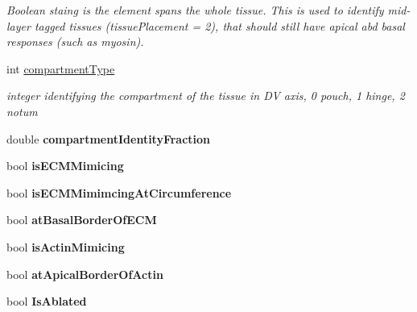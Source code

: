 \begin{DoxyCompactItemize}
\begin{DoxyCompactList}\small\item\em Boolean staing is the element spans the whole tissue. This is used to identify mid-\/layer tagged tissues (tissue\+Placement = 2), that should still have apical abd basal responses (such as myosin). \end{DoxyCompactList}\item 
\hypertarget{classShapeBase_a47bfa280bf33fc0557e8d804aab3936c}{}int \hyperlink{classShapeBase_a47bfa280bf33fc0557e8d804aab3936c}{compartment\+Type}\label{classShapeBase_a47bfa280bf33fc0557e8d804aab3936c}

\begin{DoxyCompactList}\small\item\em integer identifying the compartment of the tissue in D\+V axis, 0 pouch, 1 hinge, 2 notum \end{DoxyCompactList}\item 
\hypertarget{classShapeBase_aada8d021521dbe6815a887bc0cb28cc8}{}double {\bfseries compartment\+Identity\+Fraction}\label{classShapeBase_aada8d021521dbe6815a887bc0cb28cc8}

\item 
\hypertarget{classShapeBase_a5e442b31d2341cbe477d7c33195a576c}{}bool {\bfseries is\+E\+C\+M\+Mimicing}\label{classShapeBase_a5e442b31d2341cbe477d7c33195a576c}

\item 
\hypertarget{classShapeBase_aa25330a1d76d3ada08bd0dced22fb79b}{}bool {\bfseries is\+E\+C\+M\+Mimimcing\+At\+Circumference}\label{classShapeBase_aa25330a1d76d3ada08bd0dced22fb79b}

\item 
\hypertarget{classShapeBase_afcd1d4807f83e12b2df7606acb7518b3}{}bool {\bfseries at\+Basal\+Border\+Of\+E\+C\+M}\label{classShapeBase_afcd1d4807f83e12b2df7606acb7518b3}

\item 
\hypertarget{classShapeBase_a892e478508ed8a375f0816b330e36ac1}{}bool {\bfseries is\+Actin\+Mimicing}\label{classShapeBase_a892e478508ed8a375f0816b330e36ac1}

\item 
\hypertarget{classShapeBase_a95c9fe02c9c42e0617900c3282e4403a}{}bool {\bfseries at\+Apical\+Border\+Of\+Actin}\label{classShapeBase_a95c9fe02c9c42e0617900c3282e4403a}

\item 
\hypertarget{classShapeBase_a4f09d39d079bfe95ea7c25f5d3de6c09}{}bool {\bfseries Is\+Ablated}\label{classShapeBase_a4f09d39d079bfe95ea7c25f5d3de6c09}


\end{DoxyCompactItemize}
